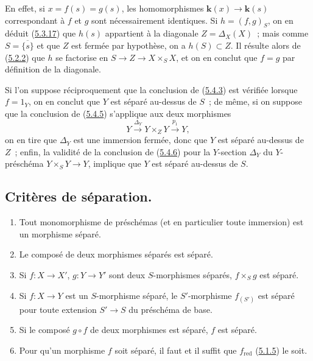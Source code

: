 En effet, si $x=f(s)=g(s)$, les homomorphismes $\boldsymbol{k}(x)\to\boldsymbol{k}(s)$ correspondant à
$f$ et $g$ sont nécessairement identiques. Si $h=(f,g)_S$, on en déduit
(\hyperref[I.5.3.17-fr]{5.3.17}) que $h(s)$ appartient à la diagonale
$Z=\Delta_X(X)$~; mais comme $S=\overline{\{s\}}$ et que $Z$ est fermée par
hypothèse, on a $h(S)\subset Z$. Il résulte alors de
(\hyperref[I.5.2.2-fr]{5.2.2}) que $h$ se factorise en
$S\to Z\to X\times_S X$, et on en conclut que $f=g$ par définition de la
diagonale.

\begin{remark}[5.4.8]
\label{I.5.4.8-fr}
\normalfont Si l'on suppose réciproquement que la conclusion de
(\hyperref[I.5.4.3-fr]{5.4.3}) est vérifiée lorsque $f=1_Y$, on en conclut
que $Y$ est séparé au-dessus de $S$~; de même, si on suppose que la conclusion
de (\hyperref[I.5.4.5-fr]{5.4.5}) s'applique aux deux morphismes
\[
  Y\xrightarrow{\Delta_Y}Y\times_Z Y\xrightarrow{p_1}Y,
\]
on en tire que $\Delta_Y$ est une immersion fermée, donc que $Y$ est séparé
au-dessus de $Z$~; enfin, la validité de la conclusion de
(\hyperref[I.5.4.6-fr]{5.4.6}) pour la $Y$-section $\Delta_Y$ du
$Y$-préschéma $Y\times_S Y\to Y$, implique que $Y$ est séparé au-dessus de
$S$.
\end{remark}

\subsection{Critères de séparation.}
\label{subsection:I.5.5-fr}

\begin{proposition}[5.5.1]
\label{I.5.5.1-fr}
\begin{enumerate}
  \item[\rm(i)] Tout monomorphisme de préschémas (et en particulier toute
    immersion) est un morphisme séparé.
  \item[\rm(ii)] Le composé de deux morphismes séparés est séparé.
  \item[\rm(iii)] Si $f:X\to X'$, $g:Y\to Y'$ sont deux $S$-morphismes
    séparés, $f\times_S g$ est séparé.
  \item[\rm(iv)] Si $f:X\to Y$ est un $S$-morphisme séparé, le
    $S'$-morphisme $f_{(S')}$ est séparé pour toute extension $S'\to S$ du
    préschéma de base.
  \item[\rm(v)] Si le composé $g\circ f$ de deux morphismes est séparé, $f$
    est séparé.
  \item[\rm(vi)] Pour qu'un morphisme $f$ soit séparé, il faut et il suffit
    que $f_{\mathrm{red}}$ \textup{(\hyperref[I.5.1.5-fr]{5.1.5})} le soit.
\end{enumerate}
\end{proposition}

